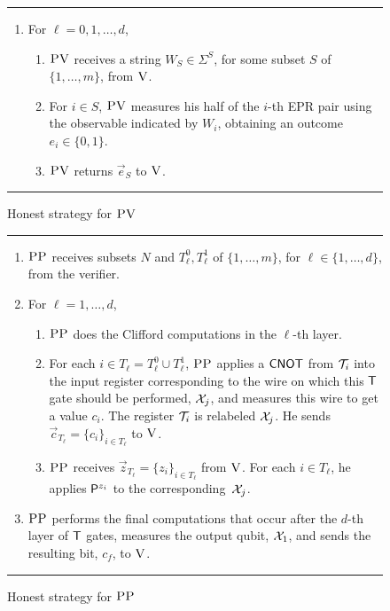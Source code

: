 \documentclass[11pt]{article}
\newcommand{\ver}{\textsc{V}}
\newcommand{\pv}{\textsc{PV}}
\newcommand{\pp}{\textsc{PP}}
\begin{document}
  \begin{figure}[H]
\rule{\textwidth}{0.5pt}
\begin{enumerate}
\item For $\ell=0,1,\ldots,d$,
\begin{enumerate}
\item $\pv$ receives a string $W_{S} \in\Sigma^{S}$, for some subset $S$ of $\{1,\ldots,m\}$, from $\ver$. 
\item For $i\in S$, $\pv$ measures his half of the $i$-th EPR pair using the observable indicated by $W_i$, obtaining an outcome $e_i\in\{0,1\}$. 
\item $\pv$ returns $\vec{e}_S$ to $\ver$. 
\end{enumerate}
\end{enumerate}
\rule[2ex]{\textwidth}{0.5pt}\vspace{-.5cm}
\caption{Honest strategy for $\pv$}\label{fig:leash-protocol-PV}
  \end{figure}
  \begin{figure}
\rule[1ex]{\textwidth}{0.5pt}
\begin{enumerate}
\item $\pp$ receives subsets $N$ and $T_\ell^0,T_\ell^1$ of $\{1,\ldots,m\}$, for $\ell\in\{1,\ldots,d\}$, from the verifier. 
\item For $\ell=1,\dots,d$, 
\begin{enumerate}
\item $\pp$ does the Clifford computations in the $\ell$-th layer.
 \item For each $i\in T_\ell = T_\ell^0\cup T_\ell^1$, $\pp$ applies a $\sf CNOT$ from ${\cal T}_i$ into the input register corresponding to the wire on which this $\sf T$ gate should be performed, ${\cal X}_{j}$, and measures this wire to get a value $c_i$. The register ${\cal T}_i$ is relabeled ${\cal X}_{j}$. He sends $\vec{c}_{T_\ell} = \{c_i\}_{i\in T_{\ell}}$ to $\ver$.
\item $\pp$ receives $\vec{z}_{T_{\ell}}=\{z_i\}_{i\in T_\ell}$ from $\ver$. For each $i\in T_\ell$, he applies ${\sf P}^{z_i}$ to the corresponding~${\cal X}_{j}$. 
\end{enumerate} 
\item $\pp$ performs the final computations that occur after the $d$-th layer of $\sf T$ gates, measures the output qubit, ${\cal X}_1$, and sends the resulting bit, $c_f$, to $\ver$. 
\end{enumerate}
\rule[2ex]{\textwidth}{0.5pt}\vspace{-.5cm}
\caption{Honest strategy for $\pp$}\label{fig:leash-protocol-PP}
\end{figure}
\end{document}

